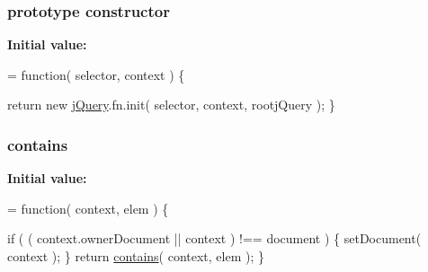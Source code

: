 \subsubsection[{constructor}]{ {\bf prototype} constructor}\label{jquery-1_810_82-vsdoc_8js_ac8c7ab4467fc25f40e85c72221a1f10b}
{\bfseries Initial value\+:}
\begin{DoxyCode}
= \textcolor{keyword}{function}( selector, context ) \{

        
        \textcolor{keywordflow}{return} \textcolor{keyword}{new} \hyperlink{jquery-1_810_82-vsdoc_8js_add5237586d970a38a81f990e8eb28c6c}{jQuery}.fn.init( selector, context, rootjQuery );
    \}
\end{DoxyCode}
\hypertarget{jquery-1_810_82-vsdoc_8js_ac28d955147e97e41b2a7cd70f91ab219}{}
\subsubsection[{contains}]{ contains}\label{jquery-1_810_82-vsdoc_8js_ac28d955147e97e41b2a7cd70f91ab219}
{\bfseries Initial value\+:}
\begin{DoxyCode}
= \textcolor{keyword}{function}( context, elem ) \{


    
    \textcolor{keywordflow}{if} ( ( context.ownerDocument || context ) !== document ) \{
        setDocument( context );
    \}
    \textcolor{keywordflow}{return} \hyperlink{jquery-1_810_82-vsdoc_8js_ac28d955147e97e41b2a7cd70f91ab219}{contains}( context, elem );
\}
\end{DoxyCode}
\hypertarget{jquery-1_810_82-vsdoc_8js_af81eeab332c74dc521f6610f4914badd}{}
